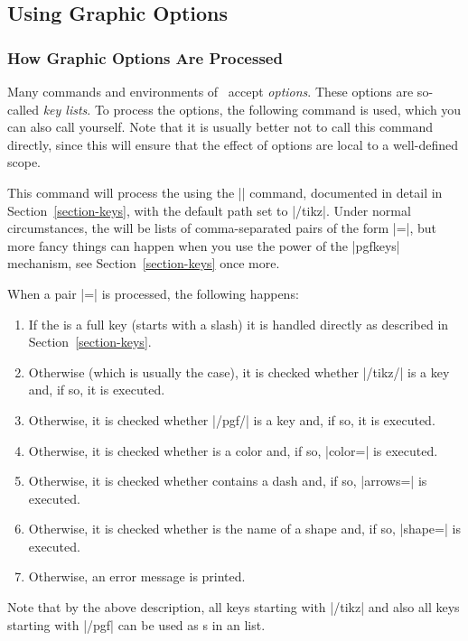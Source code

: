 \subsection{Using Graphic Options}
\label{section-graphic-options}

\subsubsection{How Graphic Options Are Processed}

Many commands and environments of \tikzname\ accept
\emph{options}. These options are so-called \emph{key lists}. To
process the options, the following command is used, which you can also
call yourself. Note that it is usually better not to call this command
directly, since this will ensure that the effect of options are local
to a well-defined scope.

\begin{command}{\tikzset{}}
  This command will process the  using the |\pgfkeys|
  command, documented in detail in Section~\ref{section-keys}, with
  the default path set to |/tikz|. Under normal circumstances, the
   will be lists of comma-separated pairs of the form
  |=|, but more fancy things can happen when you
  use the power of the |pgfkeys| mechanism, see
  Section~\ref{section-keys} once more.

  When a pair |=| is processed, the following
  happens:
  \begin{enumerate}
  \item If the  is a full key (starts with a slash) it is
    handled directly as described in Section~\ref{section-keys}.
  \item Otherwise (which is usually the case), it is checked whether
    |/tikz/| is a key and, if so, it is executed.
  \item Otherwise, it is checked whether |/pgf/| is a key
    and, if so, it is executed.
  \item Otherwise, it is checked whether  is a color and, if
    so, |color=| is executed.
  \item Otherwise, it is checked whether  contains a dash
    and, if so, |arrows=| is executed.
  \item Otherwise, it is checked whether  is the name of a
    shape and, if so, |shape=| is executed.
  \item Otherwise, an error message is printed.
  \end{enumerate}

  Note that by the above description, all keys starting with |/tikz|
  and also all keys starting with |/pgf| can be used as s in
  an  list.
\end{command}


